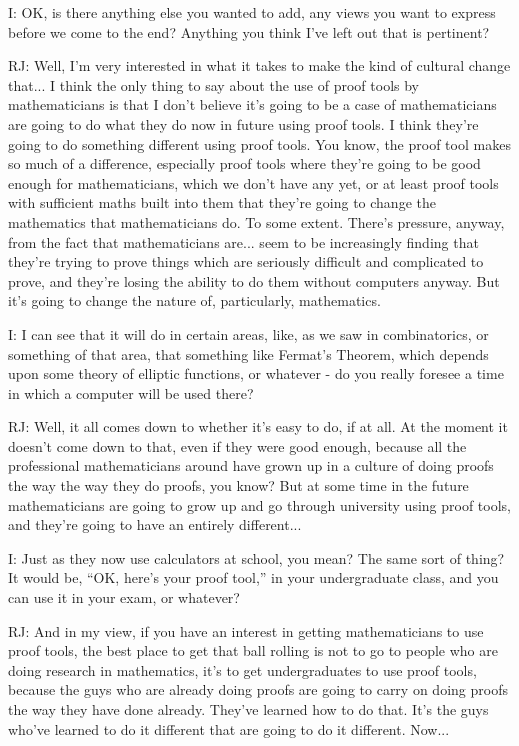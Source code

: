 \documentclass[10pt,titlepage]{book}
\begin{document}
I: OK, is there anything else you wanted to add, any views you want to express before we come to the end? Anything you think I've left out that is pertinent?

RJ: Well, I'm very interested in what it takes to make the kind of cultural change that... 
I think the only thing to say about the use of proof tools by mathematicians is that I don't believe it's going to be a case of mathematicians are going to do what they do now in future using proof tools.
I think they're going to do something different using proof tools.
You know, the proof tool makes so much of a difference, especially proof tools where they're going to be good enough for mathematicians, which we don't have any yet, or at least proof tools with sufficient maths built into them	that they're going to change the mathematics that mathematicians do. To some extent.
There's pressure, anyway, from the fact that mathematicians are... seem to be increasingly finding that they're trying to prove things which are seriously difficult and complicated to prove, and they're losing the ability to do them without computers anyway.
But it's going to change the nature of, particularly, mathematics.

I: I can see that it will do in certain areas, like, as we saw in combinatorics, or something of that area, that something like Fermat's Theorem, which depends upon some theory of elliptic functions, or whatever - do you really foresee a time in which a computer will be used there?

RJ: Well, it all comes down to whether it's easy to do, if at all.
At the moment it doesn't come down to that, even if they were good enough, because all the professional mathematicians around have grown up in a culture of doing proofs the way the way they do proofs, you know?
But at some time in the future mathematicians are going to grow up and go through university using proof tools, and they're going to have an entirely different...

I: Just as they now use calculators at school, you mean?
The same sort of thing? 
It would be, ``OK, here's your proof tool,'' in your undergraduate class, and you can use it in your exam, or whatever?

RJ: And in my view, if you have an interest in getting mathematicians to use proof tools, the best place to get that ball rolling is not to go to people who are doing research in mathematics, it's to get undergraduates to use proof tools, because the guys who are already doing proofs are going to carry on doing proofs the way they have done already.
They've learned how to do that.
It's the guys who've learned to do it different that are going to do it different.
Now...
\end{document}

